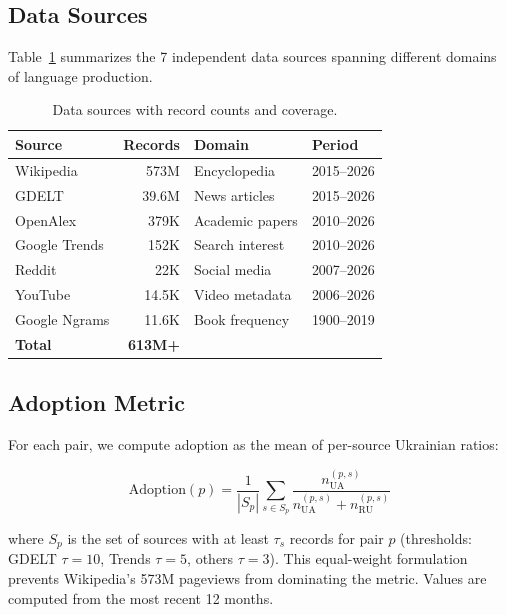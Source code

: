 \documentclass{article}
\begin{document}
\subsection{Data Sources}

Table~\ref{tab:sources} summarizes the 7 independent data sources spanning different domains of language production.

\begin{table}[t]
\centering
\small
\caption{Data sources with record counts and coverage.}
\label{tab:sources}
\begin{tabular}{lrll}
\toprule
\textbf{Source} & \textbf{Records} & \textbf{Domain} & \textbf{Period} \\
\midrule
Wikipedia & 573M & Encyclopedia & 2015--2026 \\
GDELT & 39.6M & News articles & 2015--2026 \\
OpenAlex & 379K & Academic papers & 2010--2026 \\
Google Trends & 152K & Search interest & 2010--2026 \\
Reddit & 22K & Social media & 2007--2026 \\
YouTube & 14.5K & Video metadata & 2006--2026 \\
Google Ngrams & 11.6K & Book frequency & 1900--2019 \\
\midrule
\textbf{Total} & \textbf{613M+} & & \\
\bottomrule
\end{tabular}
\end{table}

\subsection{Adoption Metric}

For each pair, we compute adoption as the mean of per-source Ukrainian ratios:

\begin{equation}
\text{Adoption}(p) = \frac{1}{|S_p|} \sum_{s \in S_p} \frac{n_{\text{UA}}^{(p,s)}}{n_{\text{UA}}^{(p,s)} + n_{\text{RU}}^{(p,s)}}
\label{eq:adoption}
\end{equation}

where $S_p$ is the set of sources with at least $\tau_s$ records for pair $p$ (thresholds: GDELT $\tau = 10$, Trends $\tau = 5$, others $\tau = 3$). This equal-weight formulation prevents Wikipedia's 573M pageviews from dominating the metric. Values are computed from the most recent 12 months.

\end{document}
